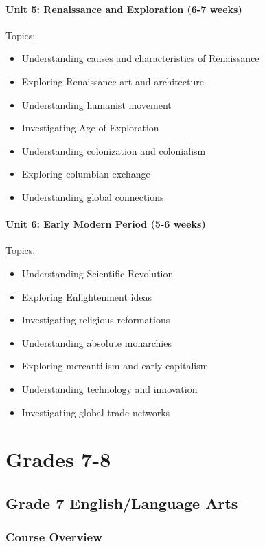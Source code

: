 \documentclass[11pt,letterpaper]{report}
\begin{document}
\subsection{Unit 5: Renaissance and Exploration (6-7 weeks)}

Topics:
\begin{itemize}
\item Understanding causes and characteristics of Renaissance
\item Exploring Renaissance art and architecture
\item Understanding humanist movement
\item Investigating Age of Exploration
\item Understanding colonization and colonialism
\item Exploring columbian exchange
\item Understanding global connections
\end{itemize}

\subsection{Unit 6: Early Modern Period (5-6 weeks)}

Topics:
\begin{itemize}
\item Understanding Scientific Revolution
\item Exploring Enlightenment ideas
\item Investigating religious reformations
\item Understanding absolute monarchies
\item Exploring mercantilism and early capitalism
\item Understanding technology and innovation
\item Investigating global trade networks
\end{itemize}

\clearpage

\part{Grades 7-8}

\chapter{Grade 7 English/Language Arts}

\section{Course Overview}
\end{document}
